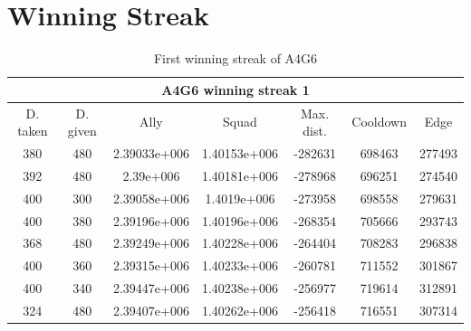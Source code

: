 \section{Winning Streak}
\begin{table}[H]

 \begin{tabular}{|c||c|c|c|c|c|c|}
	\multicolumn{7}{c}{A4G6 winning streak 1} \\
	\hline
	D. taken &			 D. given &		 Ally &		 Squad &		 Max. dist. &		 Cooldown & 		Edge \\
	\hline
	380& 				 		480&						2.39033e+006&1.40153e+006&-282631&			698463&			277493\\
	392& 						480& 					2.39e+006&		1.40181e+006&-278968&			696251&			274540\\
	400& 						300& 					2.39058e+006&1.4019e+006&	-273958&			698558&			279631\\
	400& 						380& 					2.39196e+006&1.40196e+006&-268354&			705666&			293743\\
	368& 						480& 					2.39249e+006&1.40228e+006&-264404&			708283&			296838\\
	400& 						360& 					2.39315e+006&1.40233e+006&-260781&			711552&			301867\\
	400& 						340& 					2.39447e+006&1.40238e+006&-256977&			719614&			312891\\
	324& 						480&						2.39407e+006&1.40262e+006&-256418&			716551&			307314\\
	\hline

\end{tabular}
	\label{winning_streak_A4G6_1_1}
	\caption{First winning streak of A4G6}
\end{table}




